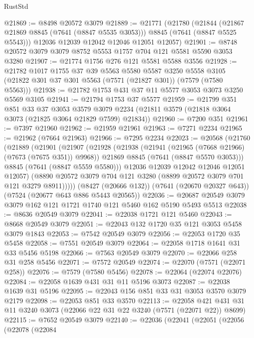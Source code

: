 \begin{lexlean}{RustStd}
\begin{coremodule}
{\begin{coremodule}
{{{{{{{{{{{{{{{{{{{{{{{{{{{{{{{{@21869 := @8498 @20572 @3079
@21889 := @21771
    (@21780
      (@21844 (@21867 @21869 @8845 (@7641 (@8847 @5535 @3053))) @8845 (@7641 (@8847 @5525 @5543)))
      @12036
      @12039
      @12042
      @12046
      @12051
      @12057)
@21901 := @8748 @20572 @3079 @3079 @8752 @5553 @1757 @704 @121 @5581 @5590 @3053 @3280
@21907 := @21774 @1756 @276 @121 @5581 @5588 @3556
@21928 := @21782
    @1017
    @1755
    @37
    @39
    @5563
    @5580
    @5587
    @3250
    @5558
    @3105
    (@21822 @301 @37 @301 @5563 (@7571 (@21827 @301)) (@7579 (@7580 @5563)))
@21938 := @21782 @1753 @431 @37 @11 @5577 @3053 @3073 @3250 @5569 @3105
@21941 := @21794 @1753 @37 @5577
@21959 := @21799
    @351
    @851
    @33
    @37
    @3053
    @3579
    @3079
    @2234
    (@21811 @3579 (@21818 @3064 @3073 (@21825 @3064 @21829 @7599) @21834))
@21960 := @7200 @351
@21961 := @7397 @21960
@21962 := @21959 @21961
@21963 := @7271 @2234
@21965 := @21962 (@7664 @21963)
@21966 := @7295 @2234
@22023 := @20568
    (@21760
      (@21889
        (@21901
          (@21907
            (@21928
              (@21938
                (@21941 (@21965 (@7668 @21966) (@7673 (@7675 @351)) @9968))
                @21869
                @8845
                (@7641 (@8847 @5570 @3053)))
              @8845
              (@7641 (@8847 @5559 @5580)))
            @12036
            @12039
            @12042
            @12046
            @12051
            @12057)
          (@8890 @20572 @3079 @704 @121 @3280 (@8899 @20572 @3079 @701 @121 @3279 @8911)))))
    (@8427 (@20666 @132))
    (@7641 (@20670 @20327 @643))
    (@7524 (@20677 @643 @886 @5443 @20565))
@22036 := @20687 @20549 @3079 @3079 @162 @121 @1721 @1740 @121 @5460 @162 @5190 @5493 @5513
@22038 := @8636 @20549 @3079
@22041 := @22038 @1721 @121 @5460
@22043 := @8668 @20549 @3079
@22051 := @22043 @132 @1720 @35 @121 @3053 @5458 @3079 @1843
@22053 := @7542 @20549 @3079
@22056 := @22053 @1720 @35 @5458
@22058 := @7551 @20549 @3079
@22064 := @22058 @1718 @1641 @31 @33 @5456 @5198
@22066 := @7563 @20549 @3079
@22070 := @22066 @258 @31 @258 @5456
@22071 := @7572 @20549
@22074 := @22070 (@7571 (@22071 @258))
@22076 := @7579 (@7580 @5456)
@22078 := @22064 (@22074 @22076)
@22084 := @22058 @1639 @431 @31 @11 @5196 @3073
@22087 := @22038 @1639 @31 @5196
@22095 := @22043 @156 @851 @33 @31 @3053 @3570 @3079 @2179
@22098 := @22053 @851 @33 @3570
@22113 := @22058 @421 @431 @31 @11 @3240 @3073 (@22066 @22 @31 @22 @3240 (@7571 (@22071 @22)) @8699)
@22115 := @7652 @20549 @3079
@22140 := @22036
    (@22041
      (@22051
        (@22056
          (@22078
            (@22084
}}}}}}}}}}}}}}}}}}}}}}}}}}}}}}}}
\end{coremodule}}
\end{coremodule}
\end{lexlean}
